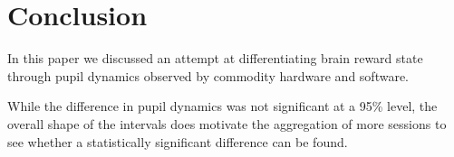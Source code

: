 \documentclass[10pt,letterpaper]{article}
\begin{document}
\section{Conclusion}
In this paper we discussed an attempt at differentiating brain reward state through pupil dynamics observed by commodity hardware and software.

While the difference in pupil dynamics was not significant at a 95\% level, the overall shape of the intervals does motivate the aggregation of more sessions to see whether a statistically significant difference can be found.








\end{document}
